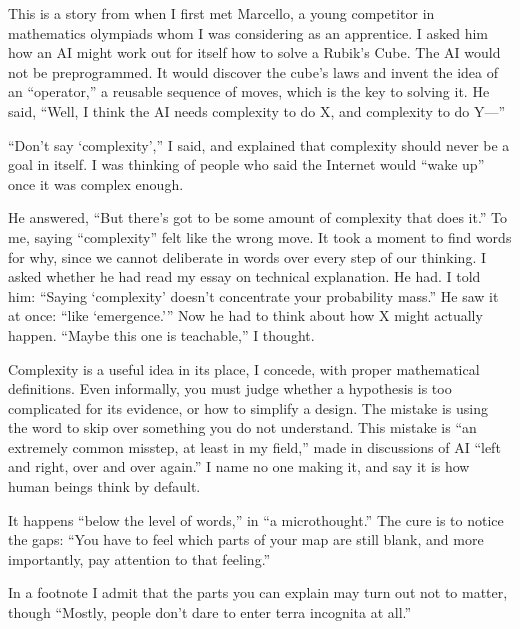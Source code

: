 
This is a story from when I first met Marcello, a young competitor in mathematics olympiads whom I was considering as an apprentice. I asked him how an AI might work out for itself how to solve a Rubik's Cube. The AI would not be preprogrammed. It would discover the cube's laws and invent the idea of an ``operator,'' a reusable sequence of moves, which is the key to solving it. He said, ``Well, I think the AI needs complexity to do X, and complexity to do Y---''

``Don't say `complexity','' I said, and explained that complexity should never be a goal in itself.  I was thinking of people who said the Internet would ``wake up'' once it was complex enough.

He answered, ``But there's got to be some amount of complexity that does it.'' To me, saying ``complexity'' felt like the wrong move. It took a moment to find words for why, since we cannot deliberate in words over every step of our thinking. I asked whether he had read my essay on technical explanation. He had. I told him: ``Saying `complexity' doesn't concentrate your probability mass.'' He saw it at once: ``like `emergence.''' Now he had to think about how X might actually happen. ``Maybe this one is teachable,'' I thought.


Complexity is a useful idea in its place, I concede, with proper mathematical definitions. Even informally, you must judge whether a hypothesis is too complicated for its evidence, or how to simplify a design. The mistake is using the word to skip over something you do not understand. This mistake is ``an extremely common misstep, at least in my field,'' made in discussions of AI ``left and right, over and over again.'' I name no one making it, and say it is how human beings think by default.

It happens ``below the level of words,'' in ``a microthought.'' The cure is to notice the gaps: ``You have to feel which parts of your map are still blank, and more importantly, pay attention to that feeling.''

In a footnote I admit that the parts you can explain may turn out not to matter, though ``Mostly, people don't dare to enter terra incognita at all.''

